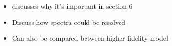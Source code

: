 \begin{itemize}
    \item \cite{das1993importance} discusses why it's important in section 6
    \item Discuss how spectra could be resolved
    \item Can also be compared between higher fidelity model
\end{itemize}